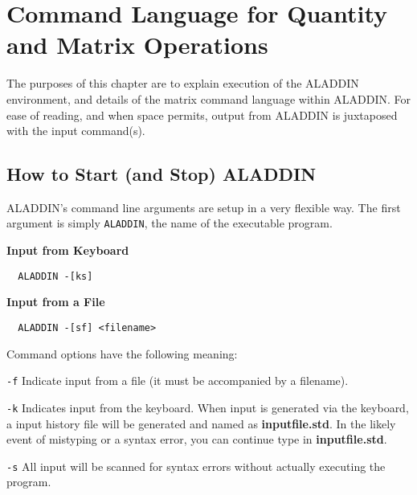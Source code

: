 \chapter{Command Language for Quantity and Matrix Operations}

\vspace{0.15 in}
\noindent\hspace{0.5 in}
The purposes of this chapter are to
explain execution of the ALADDIN environment,
and details of the matrix command language within ALADDIN.
For ease of reading, and when space permits,
output from ALADDIN is juxtaposed with the input command(s).

\section{How to Start (and Stop) ALADDIN}

\vspace{0.15 in}
\noindent\hspace{0.5 in}
ALADDIN's command line arguments are setup in a very flexible way.
The first argument is simply {\tt ALADDIN},
the name of the executable program.

\vspace{0.15 in}\noindent
{\bf Input from Keyboard}

\begin{footnotesize}
\begin{verbatim}
  ALADDIN -[ks]
\end{verbatim}
\end{footnotesize}

\vspace{0.15 in}\noindent
{\bf Input from a File}

\begin{footnotesize}
\begin{verbatim}
  ALADDIN -[sf] <filename>  
\end{verbatim}
\end{footnotesize}

\vspace{0.15 in}\noindent
Command options have the following meaning:

\begin{description} 
\item {\tt -f}
Indicate input from a file (it must be accompanied by a filename).
\item {\tt -k}
Indicates input from the keyboard. When input
is generated via the keyboard, a input history file
will be generated and named as {\bf inputfile.std}.
In the likely event of mistyping or a syntax error,
you can continue type in {\bf inputfile.std}.
\item {\tt -s}
All input will be scanned for syntax errors
without actually executing the program.
\end{description} 

